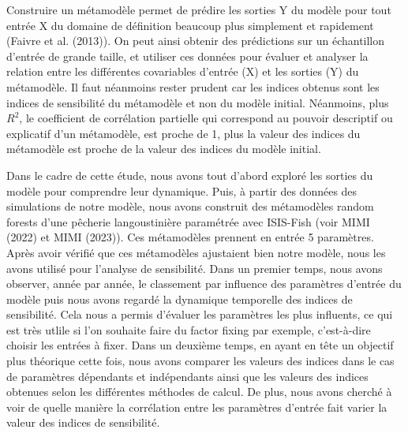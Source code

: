 \documentclass[
]{article}
\begin{document}
Construire un métamodèle permet de prédire les sorties Y du modèle pour
tout entrée X du domaine de définition beaucoup plus simplement et
rapidement (Faivre et al. (2013)). On peut ainsi obtenir des prédictions
sur un échantillon d'entrée de grande taille, et utiliser ces données
pour évaluer et analyser la relation entre les différentes covariables
d'entrée (X) et les sorties (Y) du métamodèle. Il faut néanmoins rester
prudent car les indices obtenus sont les indices de sensibilité du
métamodèle et non du modèle initial. Néanmoins, plus \(R^2\), le
coefficient de corrélation partielle qui correspond au pouvoir
descriptif ou explicatif d'un métamodèle, est proche de 1, plus la
valeur des indices du métamodèle est proche de la valeur des indices du
modèle initial.

Dans le cadre de cette étude, nous avons tout d'abord exploré les
sorties du modèle pour comprendre leur dynamique. Puis, à partir des
données des simulations de notre modèle, nous avons construit des
métamodèles random forests d'une pêcherie langoustinière paramétrée avec
ISIS-Fish (voir MIMI (2022) et MIMI (2023)). Ces métamodèles prennent en
entrée 5 paramètres. Après avoir vérifié que ces métamodèles ajustaient
bien notre modèle, nous les avons utilisé pour l'analyse de sensibilité.
Dans un premier temps, nous avons observer, année par année, le
classement par influence des paramètres d'entrée du modèle puis nous
avons regardé la dynamique temporelle des indices de sensibilité. Cela
nous a permis d'évaluer les paramètres les plus influents, ce qui est
très utlile si l'on souhaite faire du factor fixing par exemple,
c'est-à-dire choisir les entrées à fixer. Dans un deuxième temps, en
ayant en tête un objectif plus théorique cette fois, nous avons comparer
les valeurs des indices dans le cas de paramètres dépendants et
indépendants ainsi que les valeurs des indices obtenues selon les
différentes méthodes de calcul. De plus, nous avons cherché à voir de
quelle manière la corrélation entre les paramètres d'entrée fait varier
la valeur des indices de sensibilité.
\end{document}
